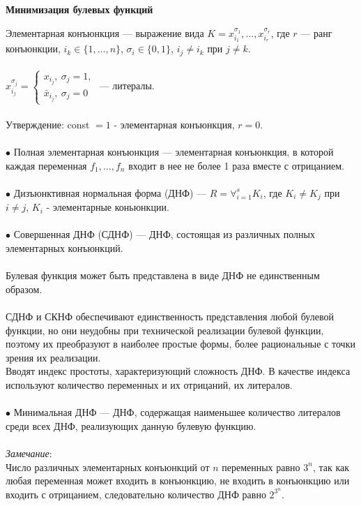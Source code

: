 \documentclass[a4paper, 12pt]{report}
\begin{document}
\begin{center}
	\textbf{Минимизация булевых функций}
\end{center}
Элементарная конъюнкция — выражение вида $K=x_{i_1}^{\sigma_1}, \dotso , x_{i_r}^{\sigma_r}$, 
где $r$ — ранг конъюнкции, $i_k\in \{1,\dotso,n\}$, $\sigma_i\in\{0, 1\}$, $i_j\neq i_k$ при $j\neq k$.\\\\
$ x_{i_j}^{\sigma_j} = \begin{cases}
	x_{i_j}, ~ \sigma_j = 1,\\
	\bar x_{i_j},  ~ \sigma_j = 0  
\end{cases}$ — литералы.\\\\
Утверждение: const $= 1$ - элементарная конъюнкция, $r=0$.\\\\
$\bullet$ Полная элементарная конъюнкция — элементарная конъюнкция, в которой каждая переменная $ f_1, \dotso, f_n $ входит в нее не более 1 раза вместе с отрицанием.\\\\
$\bullet$ Дизъюнктивная нормальная форма (ДНФ) — $ R = \forall_{i=1}^s K_i $, где $K_i \neq K_j$ при $ i\neq j$, $K_i$ - элементарные коньюнкции.\\\\
$ \bullet $ Совершенная ДНФ (СДНФ) — ДНФ, состоящая из различных полных элементарных конъюнкций.\\\\
Булевая функция может быть представлена в виде ДНФ не единственным образом.\\\\
СДНФ и СКНФ обеспечивают единственность представления любой булевой функции, но они неудобны при технической реализации булевой функции, поэтому их преобразуют в наиболее простые формы, более рациональные с точки зрения их реализации.\\
Вводят индекс простоты, характеризующий сложность ДНФ. В качестве индекса используют количество переменных и их отрицаний, их литералов.\\\\
$\bullet$
Минимальная ДНФ — ДНФ, содержащая наименьшее количество литералов среди всех ДНФ, реализующих данную булевую функцию.\\\\
\textit{Замечание}:\\
Число различных элементарных конъюнкций от $ n $ переменных равно $ 3^n $, так как любая переменная может входить в конъюнкцию, не входить в конъюнкцию или входить с отрицанием, следовательно количество ДНФ равно $ 2^{3^n} $.\\\\
\end{document}
